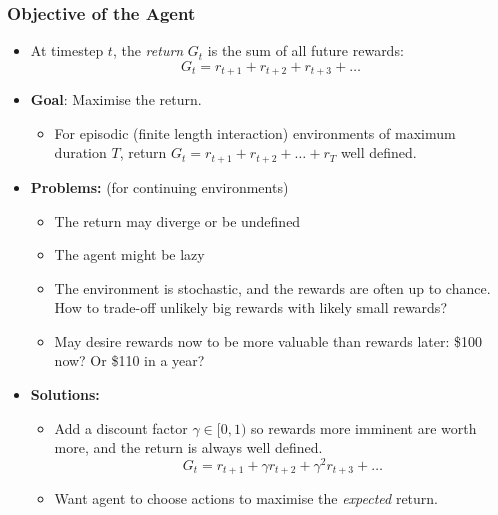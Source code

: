 \begin{frame}
	\frametitle{Objective of the Agent}
	
	\begin{itemize}
		\item At timestep $t$, the \textit{return} $G_t$ is the sum
		of all future rewards:
		$$
		G_t = r_{t+1} + r_{t+2} + r_{t+3} + \ldots 
		$$
		\pause
        \vspace{-0.6cm}
		\item \textbf{Goal}: Maximise the return.
		\pause
		\begin{itemize}
			\item For episodic  
			(finite length interaction) environments of maximum duration $T$,
			return $G_t = r_{t+1} + r_{t+2} + \ldots + r_T$ well defined.   
		\end{itemize}
		\pause
		\item \textbf{Problems:} (for continuing environments)
		\begin{itemize}
			\item The return may diverge or be undefined
            \pause
			\item The agent might be lazy
            \pause
			\item The environment is stochastic, and the rewards are often
			up to chance. How to trade-off unlikely big rewards with
			likely small rewards?
            \pause
			\item May desire rewards now to be more valuable than rewards later:
			\$100 now? Or \$110 in a year?
		\end{itemize}
		\pause
		\item \textbf{Solutions:} 
		\begin{itemize}
			\item Add a discount factor $\gamma \in [0, 1)$
			so rewards more imminent are worth more, and the
			return is always well defined.
			$$
			G_t = r_{t+1} + \gamma r_{t+2} + \gamma^2 r_{t+3} + \ldots 
			$$
			\item Want agent to choose actions to
			maximise the \textit{expected} return.
		\end{itemize}
		
	\end{itemize}
\end{frame}


